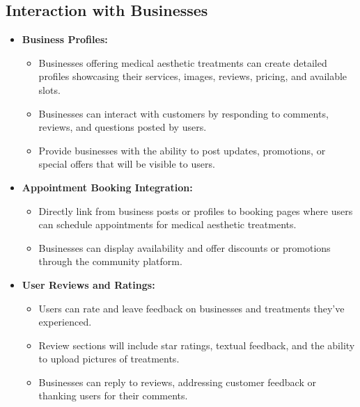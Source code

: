 \subsection{Interaction with Businesses}
\begin{itemize}
    \item \textbf{Business Profiles:}
    \begin{itemize}
        \item Businesses offering medical aesthetic treatments can create detailed profiles showcasing their services, images, reviews, pricing, and available slots.
        \item Businesses can interact with customers by responding to comments, reviews, and questions posted by users.
        \item Provide businesses with the ability to post updates, promotions, or special offers that will be visible to users.
    \end{itemize}
    
    \item \textbf{Appointment Booking Integration:}
    \begin{itemize}
        \item Directly link from business posts or profiles to booking pages where users can schedule appointments for medical aesthetic treatments.
        \item Businesses can display availability and offer discounts or promotions through the community platform.
    \end{itemize}
    
    \item \textbf{User Reviews and Ratings:}
    \begin{itemize}
        \item Users can rate and leave feedback on businesses and treatments they’ve experienced.
        \item Review sections will include star ratings, textual feedback, and the ability to upload pictures of treatments.
        \item Businesses can reply to reviews, addressing customer feedback or thanking users for their comments.
    \end{itemize}
\end{itemize}

